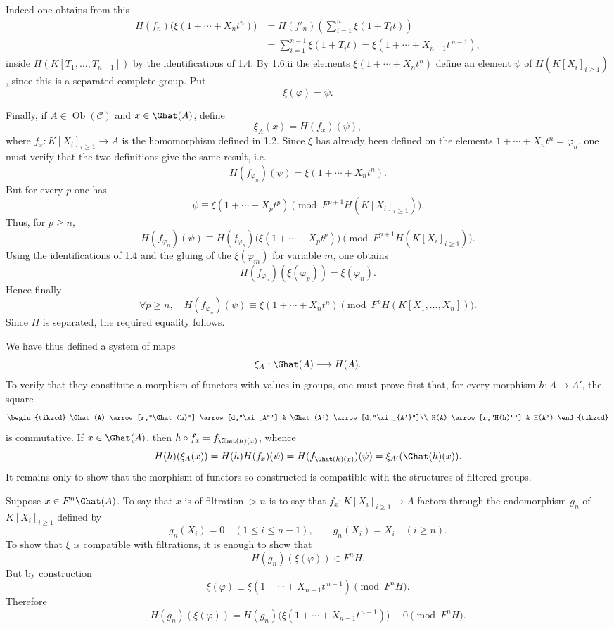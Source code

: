 Indeed one obtains from this
\[
\begin{aligned}
H(f_n)\bigl(\xi(1+\cdots+X_nt^n)\bigr)
&=H(f'_n)\left(\sum_{i=1}^n \xi(1+T_it)\right)\\
&=\sum_{i=1}^{n-1}\xi(1+T_it)
   =\xi(1+\cdots+X_{n-1}t^{\,n-1}),
\end{aligned}
\]
inside \(H(K[T_1,\ldots,T_{n-1}])\) by the identifications of 1.4. By 1.6.ii the elements \(\xi(1+\cdots+X_nt^n)\) define an element \(\psi\) of \(H(K[X_i]_{i\geq 1})\), since this is a separated complete group. Put
\[
  \xi(\varphi)=\psi .
\]

Finally, if \(A\in\operatorname{Ob}(\mathcal C)\) and \(x\in\Ghat(A)\), define
\[
  \xi_A(x)=H(f_x)(\psi),
\]
where \(f_x:K[X_i]_{i\geq 1}\to A\) is the homomorphism defined in 1.2. Since \(\xi\) has already been defined on the elements \(1+\cdots+X_nt^n=\varphi_n\), one must verify that the two definitions give the same result, i.e.
\[
  H(f_{\varphi_n})(\psi)=\xi(1+\cdots+X_nt^n).
\]
But for every \(p\) one has
\[
  \psi\equiv \xi(1+\cdots+X_pt^p)
  \pmod{F^{p+1}H(K[X_i]_{i\geq 1})}.
\]
Thus, for \(p\geq n\),
\[
  H(f_{\varphi_n})(\psi)
  \equiv
  H(f_{\varphi_n})\bigl(\xi(1+\cdots+X_pt^p)\bigr)
  \pmod{F^{p+1}H(K[X_i]_{i\geq 1})}.
\]
Using the identifications of \hyperlink{sga6.e05.para.1-4}{1.4} and the gluing of the \(\xi(\varphi_m)\) for variable \(m\), one obtains
\[
  H(f_{\varphi_n})(\xi(\varphi_p))=\xi(\varphi_n).
\]
Hence finally
\[
  \forall p\geq n,\quad
  H(f_{\varphi_n})(\psi)\equiv \xi(1+\cdots+X_nt^n)
  \pmod{F^pH(K[X_1,\ldots,X_n])}.
\]
Since \(H\) is separated, the required equality follows.

We have thus defined a system of maps
\[
  \xi_A:\Ghat(A)\longrightarrow H(A).
\]
To verify that they constitute a morphism of functors with values in groups, one must prove first that, for every morphism \(h:A\to A'\), the square
\[
\begin{tikzcd}
\Ghat(A) \arrow[r,"\Ghat(h)"] \arrow[d,"\xi_A"'] &
\Ghat(A') \arrow[d,"\xi_{A'}"]\\
H(A) \arrow[r,"H(h)"'] & H(A')
\end{tikzcd}
\]
is commutative. If \(x\in\Ghat(A)\), then \(h\circ f_x=f_{\Ghat(h)(x)}\), whence
\[
  H(h)(\xi_A(x))=H(h)H(f_x)(\psi)
  =H(f_{\Ghat(h)(x)})(\psi)=\xi_{A'}(\Ghat(h)(x)).
\]
It remains only to show that the morphism of functors so constructed is compatible with the structures of filtered groups.

Suppose \(x\in F^n\Ghat(A)\). To say that \(x\) is of filtration \(>n\) is to say that
\(f_x:K[X_i]_{i\geq 1}\to A\) factors through the endomorphism \(g_n\) of \(K[X_i]_{i\geq 1}\) defined by
\[
  g_n(X_i)=0\quad (1\leq i\leq n-1),\qquad
  g_n(X_i)=X_i\quad (i\geq n).
\]
To show that \(\xi\) is compatible with filtrations, it is enough to show that
\[
  H(g_n)(\xi(\varphi))\in F^nH.
\]
But by construction
\[
  \xi(\varphi)\equiv \xi(1+\cdots+X_{n-1}t^{\,n-1})
  \pmod{F^nH}.
\]
Therefore
\[
  H(g_n)(\xi(\varphi))
  =H(g_n)\bigl(\xi(1+\cdots+X_{n-1}t^{\,n-1})\bigr)
  \equiv 0\pmod{F^nH}.
\]

